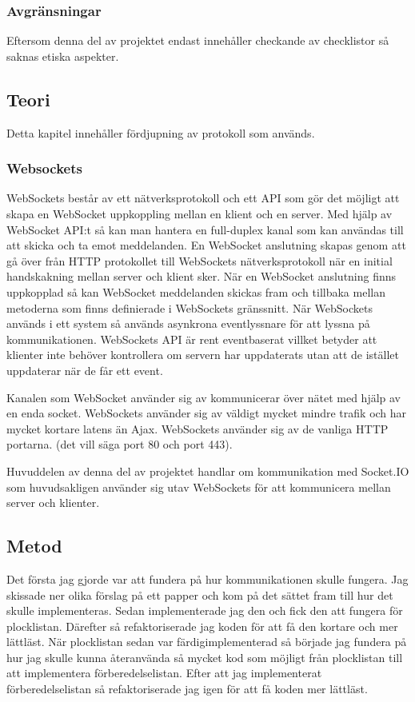\subsubsection{Avgränsningar}
Eftersom denna del av projektet endast innehåller checkande av checklistor så saknas etiska aspekter.

\pagebreak
\subsection{Teori}
Detta kapitel innehåller fördjupning av protokoll som används.
\subsubsection{Websockets}
WebSockets består av ett nätverksprotokoll och ett API som gör det möjligt att skapa en WebSocket uppkoppling mellan en klient och en server. Med hjälp av WebSocket API:t så kan man hantera en full-duplex kanal som kan användas till att skicka och ta emot meddelanden. En WebSocket anslutning skapas genom att gå över från HTTP protokollet till WebSockets nätverksprotokoll när en initial handskakning mellan server och klient sker. När en WebSocket anslutning finns uppkopplad så kan WebSocket meddelanden skickas fram och tillbaka mellan metoderna som finns definierade i WebSockets gränssnitt. När WebSockets används i ett system så används asynkrona eventlyssnare för att lyssna på kommunikationen. WebSockets API är rent eventbaserat villket betyder att klienter inte behöver kontrollera om servern har uppdaterats utan att de istället uppdaterar när de får ett event. \cite{websocketbook}

Kanalen som WebSocket använder sig av kommunicerar över nätet med hjälp av en enda socket. WebSockets använder sig av väldigt mycket mindre trafik och har mycket kortare latens än Ajax. WebSockets använder sig av de vanliga HTTP portarna. (det vill säga port 80 och port 443). \cite{websocketreport}

Huvuddelen av denna del av projektet handlar om kommunikation med Socket.IO som huvudsakligen använder sig utav WebSockets för att kommunicera mellan server och klienter.

\pagebreak
 
\subsection{Metod}
Det första jag gjorde var att fundera på hur kommunikationen skulle fungera. Jag skissade ner olika förslag på ett papper och kom på det sättet fram till hur det skulle implementeras. Sedan implementerade jag den och fick den att fungera för plocklistan. Därefter så refaktoriserade jag koden för att få den kortare och mer lättläst. När plocklistan sedan var färdigimplementerad så började jag fundera på hur jag skulle kunna återanvända så mycket kod som möjligt från plocklistan till att implementera förberedelselistan. Efter att jag implementerat förberedelselistan så refaktoriserade jag igen för att få koden mer lättläst.

